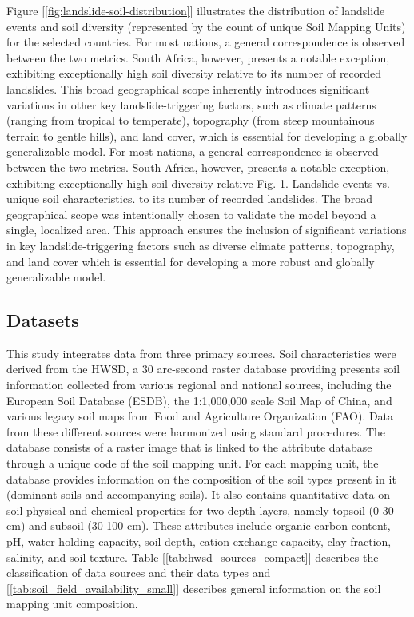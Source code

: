 Figure [\ref{fig:landslide-soil-distribution}] illustrates the distribution of landslide events and soil diversity (represented by the count of unique Soil Mapping Units) for the selected countries. For most nations, a general correspondence is observed between the two metrics. South Africa, however, presents a notable exception, exhibiting exceptionally high soil diversity relative to its number of recorded landslides. This broad geographical scope inherently introduces significant variations in other key landslide-triggering factors, such as climate patterns (ranging from tropical to temperate), topography (from steep mountainous terrain to gentle hills), and land cover, which is essential for developing a globally generalizable model. For most nations, a general correspondence is observed between the two metrics. South Africa, however, presents a notable exception, exhibiting exceptionally high soil diversity relative Fig. 1. Landslide events vs. unique soil characteristics. to its number of recorded landslides. The broad geographical scope was intentionally chosen to validate the model beyond a single, localized area. This approach ensures the inclusion of significant variations in key landslide-triggering factors such as diverse climate patterns, topography, and land cover which is essential for developing a more robust and globally generalizable model.





\subsection{Datasets}
This study integrates data from three primary sources. Soil characteristics were derived from the HWSD, a 30 arc-second raster database providing presents soil information collected from various regional and national sources, including the European Soil Database (ESDB), the 1:1,000,000 scale Soil Map of China, and various legacy soil maps from Food and Agriculture Organization (FAO). Data from these different sources were harmonized using standard procedures. The database consists of a raster image that is linked to the attribute database through a unique code of the soil mapping unit. For each mapping unit, the database provides information on the composition of the soil types present in it (dominant soils and accompanying soils). It also contains quantitative data on soil physical and chemical properties for two depth layers, namely topsoil (0-30 cm) and subsoil (30-100 cm). These attributes include organic carbon content, pH, water holding capacity, soil depth, cation exchange capacity, clay fraction, salinity, and soil texture. Table [\ref{tab:hwsd_sources_compact}] describes the classification of data sources and their data types and [\ref{tab:soil_field_availability_small}] describes general information on the soil mapping unit composition.

